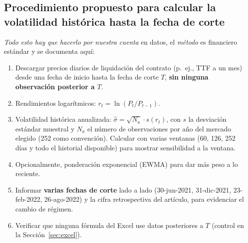 \documentclass{article} %
\begin{document}
    \subsection{Procedimiento propuesto para calcular la volatilidad histórica hasta la fecha de corte}

    \textit{Todo esto hay que hacerlo por nuestra cuenta} en datos, el \emph{método} es financiero estándar y se documenta aquí:

    \begin{enumerate}
    \item Descargar precios diarios de liquidación del contrato (p.~ej., TTF a un mes) desde una fecha de inicio hasta la fecha de corte $T$, \textbf{sin ninguna observación posterior a $T$}.
    \item Rendimientos logarítmicos: $r_t=\ln(P_t/P_{t-1})$.
    \item Volatilidad histórica anualizada: $\hat\sigma=\sqrt{N_a}\cdot s(r_t)$, con $s$ la desviación estándar muestral y $N_a$ el número de observaciones por año del mercado elegido (252 como convención). Calcular con varias ventanas (60, 126, 252 días y todo el historial disponible) para mostrar sensibilidad a la ventana.
    \item Opcionalmente, ponderación exponencial (EWMA) para dar más peso a lo reciente.
    \item Informar \textbf{varias fechas de corte} lado a lado (30-jun-2021, 31-dic-2021, 23-feb-2022, 26-ago-2022) y la cifra retrospectiva del artículo, para evidenciar el cambio de régimen.
    \item Verificar que ninguna fórmula del Excel use datos posteriores a $T$ (control en la Sección~\ref{sec:excel}).
    \end{enumerate}




\newpage

\printbibliography[title=Referencias]
\end{document}
